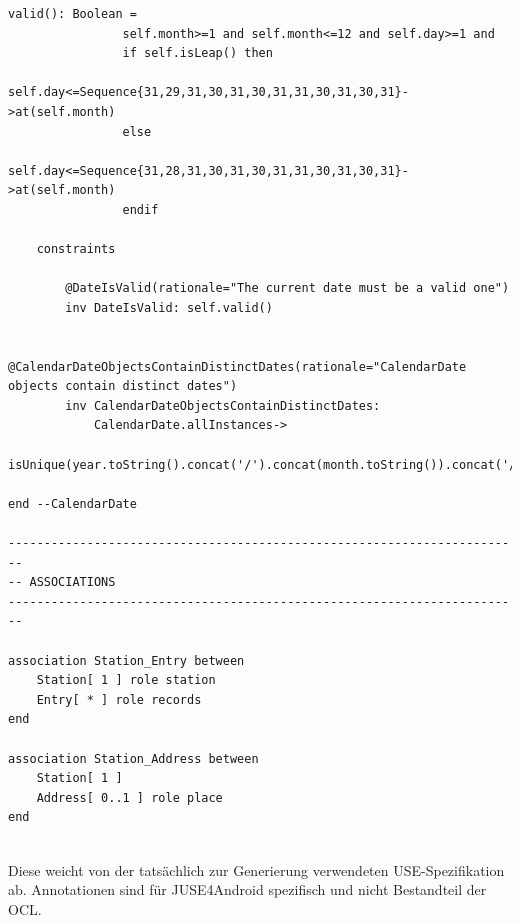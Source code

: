 \documentclass[a4paper,twoside]{article}
\begin{document}
\begin{lstlisting}[caption={Vollständige USE-Spezifikation des IceCream Modells},label=lst:completeUSE]
		valid(): Boolean =
				self.month>=1 and self.month<=12 and self.day>=1 and
				if self.isLeap() then
					self.day<=Sequence{31,29,31,30,31,30,31,31,30,31,30,31}->at(self.month)
				else 
					self.day<=Sequence{31,28,31,30,31,30,31,31,30,31,30,31}->at(self.month)
				endif

	constraints
	
		@DateIsValid(rationale="The current date must be a valid one")
		inv DateIsValid: self.valid()
		
		@CalendarDateObjectsContainDistinctDates(rationale="CalendarDate objects contain distinct dates")
		inv CalendarDateObjectsContainDistinctDates:
			CalendarDate.allInstances->
				isUnique(year.toString().concat('/').concat(month.toString()).concat('/').concat(day.toString()))
		
end --CalendarDate

------------------------------------------------------------------------
-- ASSOCIATIONS
------------------------------------------------------------------------
	
association Station_Entry between
	Station[ 1 ] role station
	Entry[ * ] role records
end

association Station_Address between
	Station[ 1 ] 
	Address[ 0..1 ] role place
end


\end{lstlisting}

Diese weicht von der tatsächlich zur Generierung verwendeten USE-Spezifikation ab.
 Annotationen sind für JUSE4Android spezifisch und nicht Bestandteil der OCL.


\twocolumn

\vfill
\end{document}
